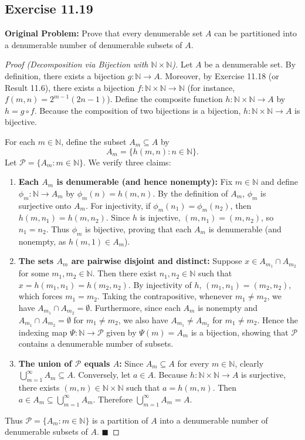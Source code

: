 \documentclass[11pt, letterpaper]{article}
\theoremstyle{definition}
\theoremstyle{remark}
\begin{document}
\subsection*{Exercise 11.19}
\textbf{Original Problem:} Prove that every denumerable set $A$ can be partitioned into a denumerable number of denumerable subsets of $A$.

\begin{proof}[Proof (Decomposition via Bijection with $\mathbb{N} \times \mathbb{N}$)]
Let $A$ be a denumerable set. By definition, there exists a bijection $g : \mathbb{N} \to A$. Moreover, by Exercise 11.18 (or Result 11.6), there exists a bijection $f : \mathbb{N} \times \mathbb{N} \to \mathbb{N}$ (for instance, $f(m, n) = 2^{m-1}(2n - 1)$). Define the composite function $h : \mathbb{N} \times \mathbb{N} \to A$ by $h = g \circ f$. Because the composition of two bijections is a bijection, $h : \mathbb{N} \times \mathbb{N} \to A$ is bijective.

For each $m \in \mathbb{N}$, define the subset $A_m \subseteq A$ by
\[
A_m = \{h(m, n) : n \in \mathbb{N}\}.
\]
Let $\mathcal{P} = \{A_m : m \in \mathbb{N}\}$. We verify three claims:
\begin{enumerate}[label=(\arabic*)]
    \item \textbf{Each $A_m$ is denumerable (and hence nonempty):} Fix $m \in \mathbb{N}$ and define $\phi_m : \mathbb{N} \to A_m$ by $\phi_m(n) = h(m, n)$. By the definition of $A_m$, $\phi_m$ is surjective onto $A_m$. For injectivity, if $\phi_m(n_1) = \phi_m(n_2)$, then $h(m, n_1) = h(m, n_2)$. Since $h$ is injective, $(m, n_1) = (m, n_2)$, so $n_1 = n_2$. Thus $\phi_m$ is bijective, proving that each $A_m$ is denumerable (and nonempty, as $h(m, 1) \in A_m$).
    
    \item \textbf{The sets $A_m$ are pairwise disjoint and distinct:} Suppose $x \in A_{m_1} \cap A_{m_2}$ for some $m_1, m_2 \in \mathbb{N}$. Then there exist $n_1, n_2 \in \mathbb{N}$ such that $x = h(m_1, n_1) = h(m_2, n_2)$. By injectivity of $h$, $(m_1, n_1) = (m_2, n_2)$, which forces $m_1 = m_2$. Taking the contrapositive, whenever $m_1 \neq m_2$, we have $A_{m_1} \cap A_{m_2} = \emptyset$. Furthermore, since each $A_m$ is nonempty and $A_{m_1} \cap A_{m_2} = \emptyset$ for $m_1 \neq m_2$, we also have $A_{m_1} \neq A_{m_2}$ for $m_1 \neq m_2$. Hence the indexing map $\Psi : \mathbb{N} \to \mathcal{P}$ given by $\Psi(m) = A_m$ is a bijection, showing that $\mathcal{P}$ contains a denumerable number of subsets.
    
    \item \textbf{The union of $\mathcal{P}$ equals $A$:} Since $A_m \subseteq A$ for every $m \in \mathbb{N}$, clearly $\bigcup_{m=1}^\infty A_m \subseteq A$. Conversely, let $a \in A$. Because $h : \mathbb{N} \times \mathbb{N} \to A$ is surjective, there exists $(m, n) \in \mathbb{N} \times \mathbb{N}$ such that $a = h(m, n)$. Then $a \in A_m \subseteq \bigcup_{m=1}^\infty A_m$. Therefore $\bigcup_{m=1}^\infty A_m = A$.
\end{enumerate}
Thus $\mathcal{P} = \{A_m : m \in \mathbb{N}\}$ is a partition of $A$ into a denumerable number of denumerable subsets of $A$. $\blacksquare$
\end{proof}
\end{document}
